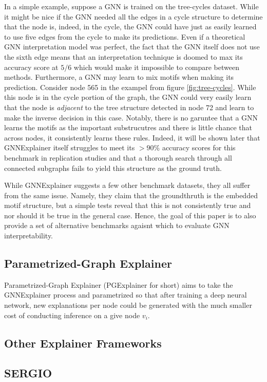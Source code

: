 In a simple example, suppose a GNN is trained on the tree-cycles dataset. While it might be nice if the GNN needed all the edges in a cycle structure to determine that the node is, indeed, in the cycle, the GNN could have just as easily learned to use five edges from the cycle to make its predictions. Even if a theoretical GNN interpretation model was perfect, the fact that the GNN itself does not use the sixth edge means that an interpretation technique is doomed to max its accuracy score at $5/6$ which would make it impossible to compare between methods. Furthermore, a GNN may learn to mix motifs when making its prediction. Consider node 565 in the exampel from figure \ref{fig:tree-cycles}. While this node is in the cycle portion of the graph, the GNN could very easily learn that the node is \textit{adjacent} to the tree structure detected in node 72 and learn to make the inverse decision in this case. Notably, there is no garuntee that a GNN learns the motifs as the important substrucutres and there is little chance that across nodes, it consistently learns these rules. Indeed, it will be shown later that GNNExplainer itself struggles to meet its $>90\%$ accuracy scores for this benchmark in replication studies \cite{yuan_explainability_2021} \cite{lin_generative_2021} and that a thorough search through all connected subgraphs fails to yield this structure as the ground truth. 

While GNNExplainer suggests a few other benchmark datasets, they all suffer from the same issue. Namely, they claim that the groundthruth is the embedded motif structure, but a simple tests reveal that this is not consistently true and nor should it be true in the general case. Hence, the goal of this paper is to also provide a set of alternative benchmarks agaisnt which to evaluate GNN interpretability.

\subsection{Parametrized-Graph Explainer}
Parametrized-Graph Explainer (PGExplainer for short) aims to take the GNNExplainer process and parametrized so that after training a deep neural network, new explanations per node could be generated with the much smaller cost of conducting inference on a give node $v_i$.

\subsection{Other Explainer Frameworks}

\subsection{SERGIO}

